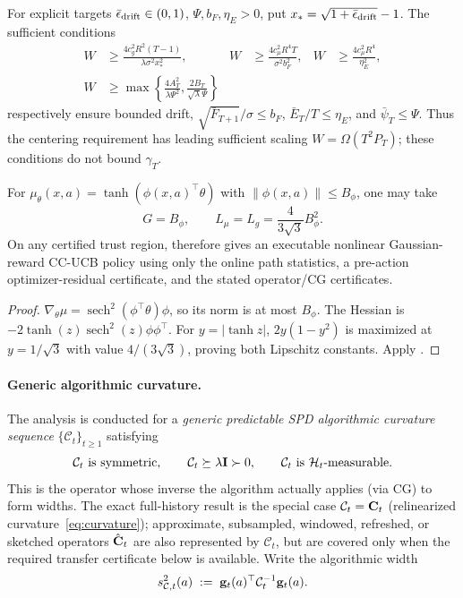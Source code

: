 \documentclass[twoside]{article}
\newcommand{\Calg}{\mathcal{C}}                 %
\newcommand{\cHist}{\mathcal{H}}                %
\begin{document}
For explicit targets
$\bar\epsilon_{\rm drift}\in(0,1)$, $\Psi,b_F,\eta_E>0$, put
$x_*=\sqrt{1+\bar\epsilon_{\rm drift}}-1$.  The sufficient conditions
\begin{equation}\label{eq:width-thresholds}
\begin{aligned}
W&\ge\frac{4c_g^2R^2(T-1)}{\lambda\sigma^2x_*^2},&
W&\ge\frac{4c_\mu^2R^4T}{\sigma^2b_F^2},&
W&\ge\frac{4c_\mu^2R^4}{\eta_E^2},\\
W&\ge\max\!\left\{\frac{4A_T^2}{\lambda\Psi^2},
\frac{2B_T}{\sqrt\lambda\Psi}\right\}
\end{aligned}
\end{equation}
respectively ensure bounded drift, $\sqrt{\bar F_{T+1}}/\sigma\le b_F$,
$\bar E_T/T\le\eta_E$, and $\bar\psi_T\le\Psi$.  Thus the centering
requirement has leading sufficient scaling $W=\Omega(T^2P_T)$; these
conditions do not bound $\gamma_T$.

\begin{corollary}\label{cor:tanh-link}
For
$\mu_\theta(x,a)=\tanh(\phi(x,a)^\top\theta)$ with
$\|\phi(x,a)\|\le B_\phi$, one may take
\[
 G=B_\phi,\qquad
 L_\mu=L_g=\frac{4}{3\sqrt3}B_\phi^2.
\]
On any certified trust region,  therefore gives an
executable nonlinear Gaussian-reward CC-UCB policy using only the online path
statistics, a pre-action optimizer-residual certificate, and the stated
operator/CG certificates.
\end{corollary}
\begin{proof}
$\nabla_\theta\mu=\operatorname{sech}^2(\phi^\top\theta)\phi$, so its norm is
at most $B_\phi$.  The Hessian is
$-2\tanh(z)\operatorname{sech}^2(z)\phi\phi^\top$.
For $y=|\tanh z|$, $2y(1-y^2)$ is maximized at $y=1/\sqrt3$ with value
$4/(3\sqrt3)$, proving both Lipschitz constants.  Apply
.
\end{proof}

\paragraph{Generic algorithmic curvature.}
The analysis is conducted for a \emph{generic predictable SPD algorithmic
curvature sequence} $\{\Calg_t\}_{t\ge1}$ satisfying
\begin{equation}\label{eq:calg-props}
  \Calg_t\ \text{is symmetric},\qquad
  \Calg_t\succeq\lambda\bI\succ 0,\qquad
  \Calg_t\ \text{is}\ \cHist_t\text{-measurable}.
\end{equation}
This is the operator whose inverse the algorithm actually applies (via CG)
to form widths.  The exact full-history result is the special case
$\Calg_t=\bC_t$ (relinearized curvature~\eqref{eq:curvature}); approximate,
subsampled, windowed, refreshed, or sketched operators $\hat{\mathbf{C}}_t$ are also
represented by $\Calg_t$, but are covered only when the required transfer
certificate below is available.  Write the algorithmic width
\begin{equation}\label{eq:scalg-def}
  s_{\Calg,t}^2(a)\;:=\;\bg_t(a)^\top\Calg_t^{-1}\bg_t(a).
\end{equation}
\end{document}
